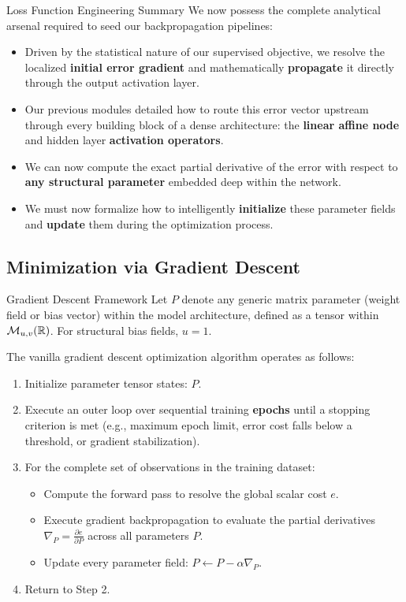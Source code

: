 \begin{frame}{Loss Function Engineering Summary}
	We now possess the complete analytical arsenal required to seed our backpropagation pipelines:
	\begin{itemize}
		\item Driven by the statistical nature of our supervised objective, we resolve the localized \textbf{initial error gradient} and mathematically \textbf{propagate} it directly through the output activation layer.
		\pause
		\item Our previous modules detailed how to route this error vector upstream through every building block of a dense architecture: the \textbf{linear affine node} and hidden layer \textbf{activation operators}.
		\pause
		\item We can now compute the exact partial derivative of the error with respect to \textbf{any structural parameter} embedded deep within the network.
		\pause
		\item We must now formalize how to intelligently \textbf{initialize} these parameter fields and \textbf{update} them during the optimization process.
	\end{itemize}
\end{frame}

\subsection[Minimization via Gradient Descent]{Minimization via Gradient Descent}

\begin{frame}{Gradient Descent Framework}
	Let $P$ denote any generic matrix parameter (weight field or bias vector) within the model architecture, defined as a tensor within $\mathcal{M}_{u,v}(\mathbb{R})$. For structural bias fields, $u = 1$.
	
	\vspace{0.3cm}
	\pause
	
	The vanilla gradient descent optimization algorithm operates as follows:
	\begin{enumerate}
		\item Initialize parameter tensor states: $P$.
		\pause
		\item Execute an outer loop over sequential training \textbf{epochs} until a stopping criterion is met (e.g., maximum epoch limit, error cost falls below a threshold, or gradient stabilization).
		\pause
		\item For the complete set of observations in the training dataset:
		\begin{itemize}
			\item Compute the forward pass to resolve the global scalar cost $e$.
			\pause
			\item Execute gradient backpropagation to evaluate the partial derivatives $\nabla_P = \frac{\partial{e}}{\partial{P}}$ across all parameters $P$.
			\pause
			\item Update every parameter field: $P \leftarrow P - \alpha \nabla_P$.
		\end{itemize}
		\item Return to Step 2.		
	\end{enumerate}
\end{frame}


